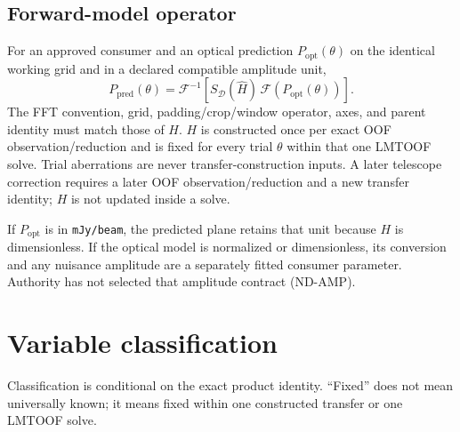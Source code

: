 \documentclass[11pt]{article}
\newcommand{\FFT}{\mathcal{F}}
\newcommand{\IFFT}{\mathcal{F}^{-1}}
\begin{document}
\subsection{Forward-model operator}

For an approved consumer and an optical prediction
$P_{\mathrm{opt}}(\theta)$ on the identical working grid and in a declared
compatible amplitude unit,
\begin{equation}
 P_{\mathrm{pred}}(\theta)=
 \IFFT\!\left[S_{\mathcal D}(\widehat H)\,
 \FFT\!\left(P_{\mathrm{opt}}(\theta)\right)\right].
 \label{eq:forward}
\end{equation}
The FFT convention, grid, padding/crop/window operator, axes, and parent
identity must match those of $H$.  $H$ is constructed once per exact OOF
observation/reduction and is fixed for every trial $\theta$ within that one
LMTOOF solve.  Trial aberrations are never transfer-construction inputs.  A
later telescope correction requires a later OOF observation/reduction and a
new transfer identity; $H$ is not updated inside a solve.

If $P_{\mathrm{opt}}$ is in \texttt{mJy/beam}, the predicted plane retains
that unit because $H$ is dimensionless.  If the optical model is normalized or
dimensionless, its conversion and any nuisance amplitude are a separately
fitted consumer parameter.  Authority has not selected that amplitude
contract (ND-AMP).

\section{Variable classification}

Classification is conditional on the exact product identity.  ``Fixed'' does
not mean universally known; it means fixed within one constructed transfer or
one LMTOOF solve.
\end{document}
